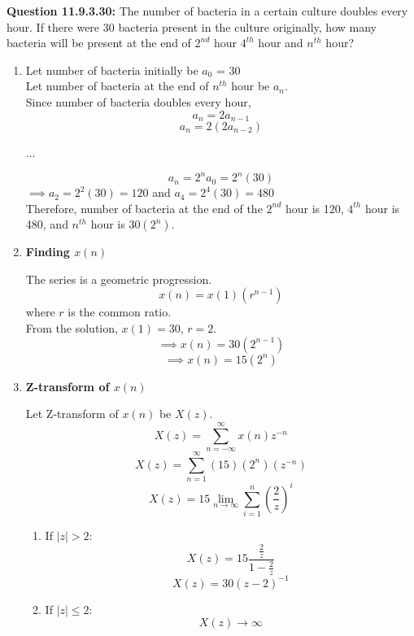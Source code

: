 \documentclass[journal,12pt,twocolumn]{IEEEtran}
\theoremstyle{remark}
\begin{document}
\vspace{1cm}
\textbf{Question 11.9.3.30:} The number of bacteria in a certain culture doubles every hour. If there were 30 bacteria present in the culture originally, how many bacteria will be present at the end of $2^{nd}$ hour $4^{th}$ hour and $n^{th}$ hour?
\\
\solution
\begin{enumerate}
\item
Let number of bacteria initially be $a_0$ = 30
\\
Let number of bacteria at the end of $n^{th}$ hour be $a_n$.
\\
Since number of bacteria doubles every hour, \[a_n = 2a_{n - 1}\]
\[a_n = 2(2a_{n - 2})\]
\begin{center}
...
\end{center}
\[a_n = 2^na_0 = 2^n(30)\]
$\implies a_2 = 2^2(30) = 120$ and $a_4 = 2^4(30) = 480$
\\

Therefore, number of bacteria at the end of the $2^{nd}$ hour is 120, $4^{th}$ hour is 480, and $n^{th}$ hour is $30(2^n)$.

\item \textbf{Finding $x(n)$}

The series is a geometric progression.
\[x(n) = x(1) (r^{n-1})\]
where $r$ is the common ratio.\\
From the solution, $x(1) = 30$, $r = 2$.
\[\implies x(n) = 30(2^{n-1})\]
\[\implies x(n) = 15(2^n)\]

\item \textbf{Z-transform of $x(n)$}

Let Z-transform of $x(n)$ be $X(z)$.
\[X(z) = \sum_{n = -\infty}^{\infty} x(n)z^{-n}\]
\[X(z) = \sum_{n = 1}^{\infty} (15)(2^n)(z^{-n})\]
\[X(z) = 15\lim_{n\to\infty}\sum_{i = 1}^{n}(\frac{2}{z})^i\]

\begin{enumerate}
\item If $|z| > 2$:
\[X(z) = 15\frac{\frac{2}{z}}{1 - \frac{2}{z}}\]
\[X(z) = 30(z - 2)^{-1}\]

\item If $|z| \le 2$:
\[X(z) \to \infty\]

\end{enumerate}

\end{enumerate}
\end{document}
